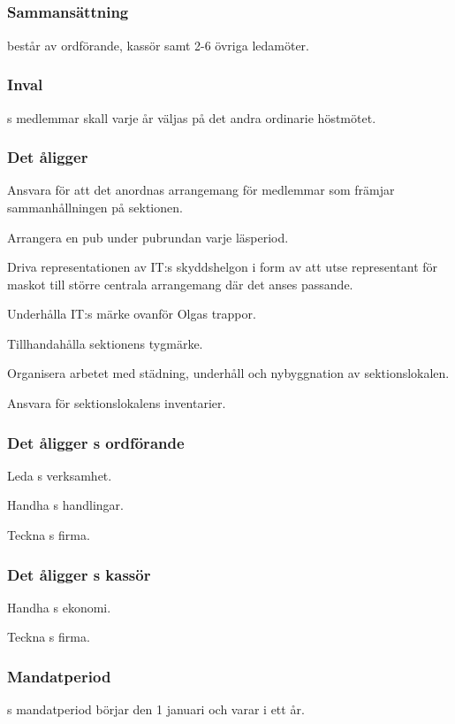 \subsection{\PRITFULL}
\subsubsection{Sammansättning}
\PRIT{} består av ordförande, kassör samt 2-6 övriga ledamöter.

\subsubsection{Inval}
\PRIT{}s medlemmar skall varje år väljas på det andra ordinarie höstmötet.

\subsubsection{Det åligger \PRIT}
\begin{att}
	\item Ansvara för att det anordnas arrangemang för medlemmar som främjar sammanhållningen på sektionen.
	\item Arrangera en pub under pubrundan varje läsperiod.
	\item Driva representationen av IT:s skyddshelgon i form av att utse representant för maskot till större centrala arrangemang där det anses passande.
	\item Underhålla IT:s märke ovanför Olgas trappor.
	\item Tillhandahålla sektionens tygmärke.
	\item Organisera arbetet med städning, underhåll och nybyggnation av sektionslokalen.
	\item Ansvara för sektionslokalens inventarier.
\end{att}

\subsubsection{Det åligger \PRIT{}s ordförande}
\begin{att}
	\item Leda \PRIT{}s verksamhet.
	\item Handha \PRIT{}s handlingar.
	\item Teckna \PRIT{}s firma.
\end{att}

\subsubsection{Det åligger \PRIT{}s kassör}
\begin{att}
	\item Handha \PRIT{}s ekonomi.
	\item Teckna \PRIT{}s firma.
\end{att}

\subsubsection{Mandatperiod}
\PRIT{}s mandatperiod börjar den 1 januari och varar i ett år.
